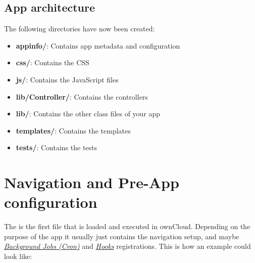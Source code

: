 \documentclass[letterpaper,10pt,english]{sphinxmanual}
\begin{document}
\subsection{App architecture}
\label{app/startapp:app-architecture}
The following directories have now been created:
\begin{itemize}
\item {} 
\textbf{appinfo/}: Contains app metadata and configuration

\item {} 
\textbf{css/}: Contains the CSS

\item {} 
\textbf{js/}: Contains the JavaScript files

\item {} 
\textbf{lib/Controller/}: Contains the controllers

\item {} 
\textbf{lib/}: Contains the other class files of your app

\item {} 
\textbf{templates/}: Contains the templates

\item {} 
\textbf{tests/}: Contains the tests

\end{itemize}


\section{Navigation and Pre-App configuration}
\label{app/init::doc}\label{app/init:navigation-and-pre-app-configuration}
The  is the first file that is loaded and executed in ownCloud. Depending on the purpose of the app it usually just contains the navigation setup, and maybe {\hyperref[app/backgroundjobs::doc]{\emph{\emph{Background Jobs (Cron)}}}} and {\hyperref[app/hooks::doc]{\emph{\emph{Hooks}}}} registrations. This is how an example  could look like:
\end{document}
